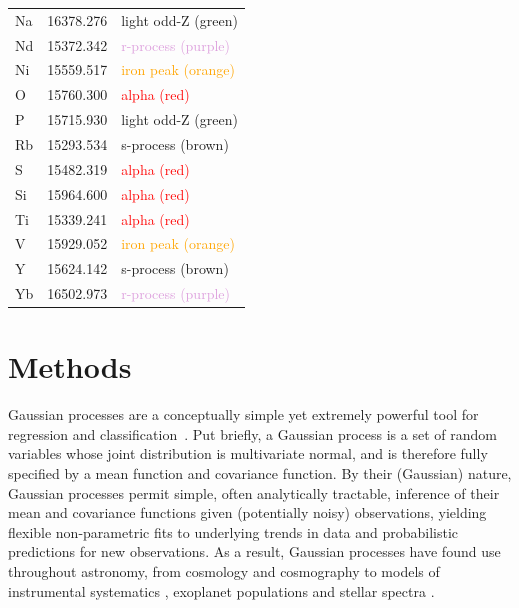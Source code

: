 \documentclass[a4paper,fleqn,usenatbib]{mnras}
\begin{document}
\begin{table}
\begin{tabular}{lcl}
        Na & 16378.276 & \textcolor{OliveGreen}{light odd-Z (green)} \\
        Nd & 15372.342 & \textcolor{Plum}{r-process (purple)} \\
        Ni & 15559.517 & \textcolor{orange}{iron peak (orange)} \\
        O & 15760.300 & \textcolor{red}{alpha (red)} \\
        P & 15715.930 & \textcolor{OliveGreen}{light odd-Z (green)} \\
        Rb & 15293.534 & \textcolor{Sepia}{s-process (brown)} \\
        S & 15482.319 & \textcolor{red}{alpha (red)} \\
        Si & 15964.600 & \textcolor{red}{alpha (red)} \\
        Ti & 15339.241 & \textcolor{red}{alpha (red)} \\
        V & 15929.052 & \textcolor{orange}{iron peak (orange)} \\
        Y & 15624.142 & \textcolor{Sepia}{s-process (brown)} \\
        Yb & 16502.973 & \textcolor{Plum}{r-process (purple)} \\
        \hline
    \end{tabular}
\end{table}


\section{Methods}
\label{sec:methods}

Gaussian processes are a conceptually simple yet extremely powerful tool for regression and classification~\citep{Rasmussen_Williams}. Put briefly, a Gaussian process is a set of random variables whose joint distribution is multivariate normal, and is therefore fully specified by a mean function and covariance function. By their (Gaussian) nature, Gaussian processes permit simple, often analytically tractable, inference of their mean and covariance functions given (potentially noisy) observations, yielding flexible non-parametric fits to underlying trends in data and probabilistic predictions for new observations. As a result, Gaussian processes have found use throughout astronomy, from cosmology \citep{Bond_etal:1987} and cosmography \citep{Shafieloo_etal:2012} to models of instrumental systematics \citep{Gibson_etal:2012}, exoplanet populations \citep{DFM_etal:2014} and stellar spectra \citep{Czekala_etal:2017}.
\end{document}
